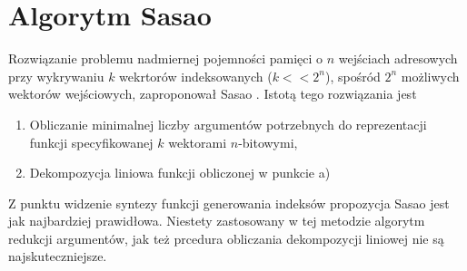 \section{Algorytm Sasao}
Rozwiązanie problemu nadmiernej pojemności pamięci o $n$ wejściach adresowych przy wykrywaniu $k$ wekrtorów indeksowanych ($k<<2^n$),
spośród $2^n$ możliwych wektorów wejściowych,
zaproponował Sasao \cite{sasao-workshop, sasao-recent, sasao-s-min, sasao-synthesis}.
Istotą tego rozwiązania jest
\begin{enumerate}[label=\alph*)]
\item Obliczanie minimalnej liczby argumentów potrzebnych do reprezentacji funkcji specyfikowanej $k$ wektorami $n$-bitowymi,
\item Dekompozycja liniowa funkcji obliczonej w punkcie a)
\end{enumerate}

Z punktu widzenie syntezy funkcji generowania indeksów propozycja Sasao jest jak najbardziej prawidłowa. Niestety zastosowany w tej metodzie algorytm redukcji argumentów,
jak też prcedura obliczania dekompozycji liniowej nie są najskuteczniejsze.

%
